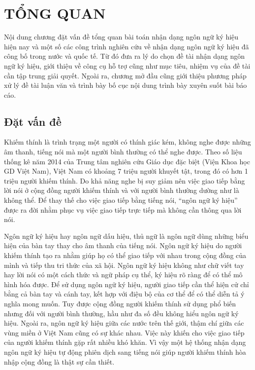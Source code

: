 \chapter{TỔNG QUAN}
\label{s:tong_quan}
Nội dung chương đặt vấn đề tổng quan bài toán nhận dạng ngôn ngữ ký hiệu hiện nay và một số các công trình nghiên cứu về nhận dạng ngôn ngữ ký hiệu đã công bố trong nước và quốc tế. Từ đó đưa ra lý do chọn đề tài nhận dạng ngôn ngữ ký hiệu, giới thiệu về công cụ hỗ trợ cũng như mục tiêu, nhiệm vụ của đề tài cần tập trung giải quyết. Ngoài ra, chương mở đầu cũng giới thiệu phương pháp xử lý đề tài luận văn và trình bày bố cục nội dung trình bày xuyên suốt bài báo cáo.

\section{Đặt vấn đề}
Khiếm thính là trình trạng một người có thính giác kém, không nghe được những âm thanh, tiếng nói mà một người bình thường có thể nghe được. Theo số liệu thống kê năm 2014 của Trung tâm nghiên cứu Giáo dục đặc biệt (Viện Khoa học GD Việt Nam), Việt Nam có khoảng 7 triệu người khuyết tật, trong đó có hơn 1 triệu người khiếm thính. Do khả năng nghe bị suy giảm nên việc giao tiếp bằng lời nói ở cộng đồng người khiếm thính  và với người bình thường dường như là không thể. Để thay thế cho việc giao tiếp bằng tiếng nói, “ngôn ngữ ký hiệu” được ra đời nhằm phục vụ việc giao tiếp trực tiếp mà không cần thông qua lời nói.

Ngôn ngữ ký hiệu hay ngôn ngữ dấu hiệu, thủ ngữ là ngôn ngữ dùng những biểu hiện của bàn tay thay cho âm thanh của tiếng nói. Ngôn ngữ ký hiệu do người khiếm thính tạo ra nhằm giúp họ có thể giao tiếp với nhau trong cộng đồng của mình và tiếp thu tri thức của xã hội. Ngôn ngữ ký hiệu không như chữ viết tay hay lời nói có một cách thức và ngữ pháp cụ thể, ký hiệu rõ ràng để có thể mô hình hóa được. Để sử dụng ngôn ngữ ký hiệu, người giao tiếp cần thể hiện cử chỉ bằng cả bàn tay và cánh tay, kết hợp với điệu bộ của cơ thể để có thể diễn tả ý nghĩa mong muốn. Tuy được cộng đồng người khiếm thính sử dụng phổ biến nhưng đối với người bình thường, hầu như đa số đều không hiểu ngôn ngữ ký hiệu. Ngoài ra, ngôn ngữ ký hiệu giữa các nước trên thế giới, thậm chí giữa các vùng miền ở Việt Nam cũng có sự khác nhau. Việc này khiến cho việc giao tiếp của người khiếm thính gặp rất nhiều khó khăn. Vì vậy một hệ thống nhận dạng ngôn ngữ ký hiệu tự động phiên dịch sang tiếng nói giúp người khiếm thính hòa nhập cộng đồng là thật sự cần thiết.

